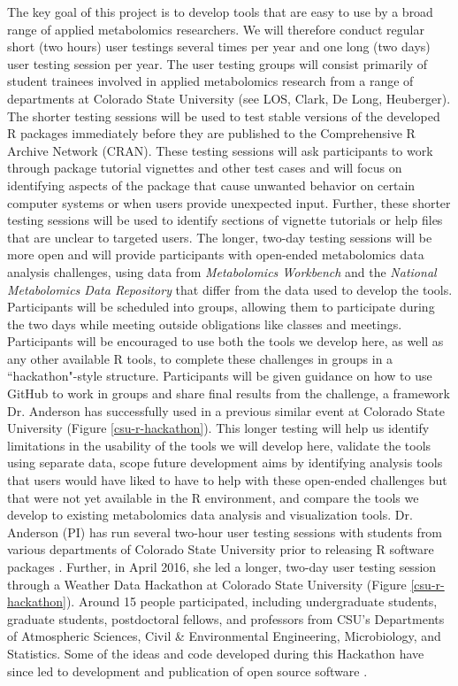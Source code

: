\documentclass[pdftex,english,11pt,parskip=half]{scrartcl}
\begin{document}
The key goal of this project is to develop tools that are easy to use by a broad range of applied metabolomics researchers. We will therefore conduct regular short (two hours) user testings several times per year and one long (two days) user testing session per year. The user testing groups will consist primarily of student trainees involved in applied metabolomics research from a range of departments at Colorado State University (see LOS, Clark, De Long, Heuberger). The shorter testing sessions will be used to test stable versions of the developed R packages immediately before they are published to the Comprehensive R Archive Network (CRAN). These testing sessions will ask participants to work through package tutorial vignettes and other test cases and will focus on identifying aspects of the package that cause unwanted behavior on certain computer systems or when users provide unexpected input. Further, these shorter testing sessions will be used to identify sections of vignette tutorials or help files that are unclear to targeted users. The longer, two-day testing sessions will be more open and will provide participants with open-ended metabolomics data analysis challenges, using data from \textit{Metabolomics Workbench} and the \textit{National Metabolomics Data Repository} that differ from the data used to develop the tools. Participants will be scheduled into groups, allowing them to participate during the two days while meeting outside obligations like classes and meetings. Participants will be encouraged to use both the tools we develop here, as well as any other available R tools, to complete these challenges in groups in a ``hackathon"-style structure. Participants will be given guidance on how to use GitHub to work in groups and share final results from the challenge, a framework Dr. Anderson has successfully used in a previous similar event at Colorado State University (Figure \ref{csu-r-hackathon}). This longer testing will help us identify limitations in the usability of the tools we will develop here, validate the tools using separate data, scope future development aims by identifying analysis tools that users would have liked to have to help with these open-ended challenges but that were not yet available in the R environment, and compare the tools we develop to existing metabolomics data analysis and visualization tools. Dr. Anderson (PI) has run several two-hour user testing sessions with students from various departments of Colorado State University prior to releasing R software packages \cite{futureheatwaves, countyweather}. Further, in April 2016, she led a longer, two-day user testing session through a Weather Data Hackathon at Colorado State University (Figure \ref{csu-r-hackathon}). Around 15 people participated, including undergraduate students, graduate students, postdoctoral fellows, and professors from CSU's Departments of Atmospheric Sciences, Civil \& Environmental Engineering, Microbiology, and Statistics. Some of the ideas and code developed during this Hackathon have since led to development and publication of open source software \cite{countyfloods, noaastormevents}.
\end{document}
